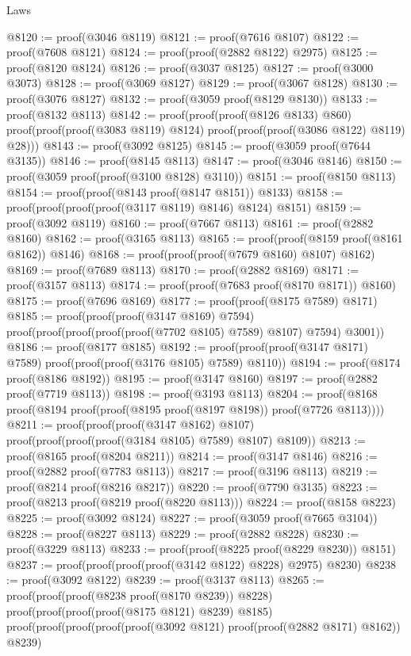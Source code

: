 \begin{lexlean}{Laws}
\begin{coremodule}
@8120 := proof(@3046 @8119)
@8121 := proof(@7616 @8107)
@8122 := proof(@7608 @8121)
@8124 := proof(proof(@2882 @8122) @2975)
@8125 := proof(@8120 @8124)
@8126 := proof(@3037 @8125)
@8127 := proof(@3000 @3073)
@8128 := proof(@3069 @8127)
@8129 := proof(@3067 @8128)
@8130 := proof(@3076 @8127)
@8132 := proof(@3059 proof(@8129 @8130))
@8133 := proof(@8132 @8113)
@8142 := proof(proof(proof(@8126 @8133) @860)
      proof(proof(proof(@3083 @8119) @8124) proof(proof(proof(@3086 @8122) @8119) @28)))
@8143 := proof(@3092 @8125)
@8145 := proof(@3059 proof(@7644 @3135))
@8146 := proof(@8145 @8113)
@8147 := proof(@3046 @8146)
@8150 := proof(@3059 proof(proof(@3100 @8128) @3110))
@8151 := proof(@8150 @8113)
@8154 := proof(proof(@8143 proof(@8147 @8151)) @8133)
@8158 := proof(proof(proof(proof(@3117 @8119) @8146) @8124) @8151)
@8159 := proof(@3092 @8119)
@8160 := proof(@7667 @8113)
@8161 := proof(@2882 @8160)
@8162 := proof(@3165 @8113)
@8165 := proof(proof(@8159 proof(@8161 @8162)) @8146)
@8168 := proof(proof(proof(@7679 @8160) @8107) @8162)
@8169 := proof(@7689 @8113)
@8170 := proof(@2882 @8169)
@8171 := proof(@3157 @8113)
@8174 := proof(proof(@7683 proof(@8170 @8171)) @8160)
@8175 := proof(@7696 @8169)
@8177 := proof(proof(@8175 @7589) @8171)
@8185 := proof(proof(proof(@3147 @8169) @7594)
      proof(proof(proof(proof(proof(@7702 @8105) @7589) @8107) @7594) @3001))
@8186 := proof(@8177 @8185)
@8192 := proof(proof(proof(@3147 @8171) @7589) proof(proof(proof(@3176 @8105) @7589) @8110))
@8194 := proof(@8174 proof(@8186 @8192))
@8195 := proof(@3147 @8160)
@8197 := proof(@2882 proof(@7719 @8113))
@8198 := proof(@3193 @8113)
@8204 := proof(@8168 proof(@8194 proof(proof(@8195 proof(@8197 @8198)) proof(@7726 @8113))))
@8211 := proof(proof(proof(@3147 @8162) @8107)
      proof(proof(proof(proof(@3184 @8105) @7589) @8107) @8109))
@8213 := proof(@8165 proof(@8204 @8211))
@8214 := proof(@3147 @8146)
@8216 := proof(@2882 proof(@7783 @8113))
@8217 := proof(@3196 @8113)
@8219 := proof(@8214 proof(@8216 @8217))
@8220 := proof(@7790 @3135)
@8223 := proof(@8213 proof(@8219 proof(@8220 @8113)))
@8224 := proof(@8158 @8223)
@8225 := proof(@3092 @8124)
@8227 := proof(@3059 proof(@7665 @3104))
@8228 := proof(@8227 @8113)
@8229 := proof(@2882 @8228)
@8230 := proof(@3229 @8113)
@8233 := proof(proof(@8225 proof(@8229 @8230)) @8151)
@8237 := proof(proof(proof(proof(@3142 @8122) @8228) @2975) @8230)
@8238 := proof(@3092 @8122)
@8239 := proof(@3137 @8113)
@8265 := proof(proof(proof(@8238 proof(@8170 @8239)) @8228)
      proof(proof(proof(proof(@8175 @8121) @8239) @8185)
          proof(proof(proof(proof(proof(@3092 @8121) proof(proof(@2882 @8171) @8162)) @8239)

\end{coremodule}
\end{lexlean}

